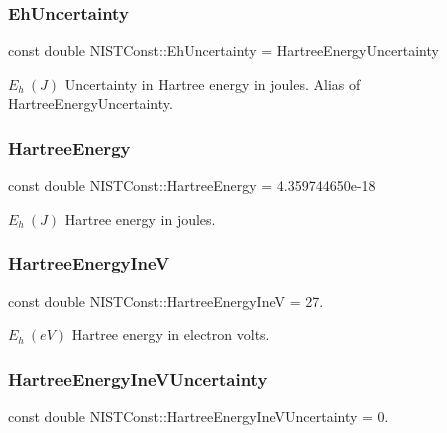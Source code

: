 \subsubsection{\texorpdfstring{Eh\+Uncertainty}{EhUncertainty}}
{\footnotesize\ttfamily const double N\+I\+S\+T\+Const\+::\+Eh\+Uncertainty = Hartree\+Energy\+Uncertainty}

$E_h \ (J)$ Uncertainty in Hartree energy in joules. Alias of Hartree\+Energy\+Uncertainty. \mbox{\label{group___n_i_s_t_const-_hartree_energy_gab58dc1c4e59e83d4fb1217778fe9f29b}} 
\subsubsection{\texorpdfstring{Hartree\+Energy}{HartreeEnergy}}
{\footnotesize\ttfamily const double N\+I\+S\+T\+Const\+::\+Hartree\+Energy = 4.\+359744650e-\/18}

$E_h \ (J)$ Hartree energy in joules. \mbox{\label{group___n_i_s_t_const-_hartree_energy_ga400eb5b8c9b55b0f601870ba54120364}} 
\subsubsection{\texorpdfstring{Hartree\+Energy\+IneV}{HartreeEnergyIneV}}
{\footnotesize\ttfamily const double N\+I\+S\+T\+Const\+::\+Hartree\+Energy\+IneV = 27.}

$E_h \ (eV)$ Hartree energy in electron volts. \mbox{\label{group___n_i_s_t_const-_hartree_energy_gaa6e7ae83f510023bdd88d80dae80f97d}} 
\subsubsection{\texorpdfstring{Hartree\+Energy\+Ine\+V\+Uncertainty}{HartreeEnergyIneVUncertainty}}
{\footnotesize\ttfamily const double N\+I\+S\+T\+Const\+::\+Hartree\+Energy\+Ine\+V\+Uncertainty = 0.}

